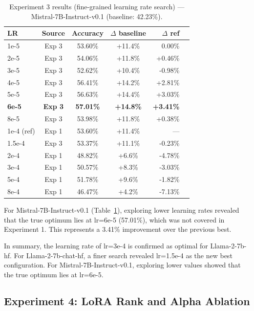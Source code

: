   \begin{table}[ht]
  \caption{Experiment 3 results (fine-grained learning rate search) --- Mistral-7B-Instruct-v0.1 (baseline: 42.23\%).}
  \centering
  \footnotesize
  \begin{tabular}{lcccrr}
  \toprule
  \textbf{LR} & \textbf{Source} & \textbf{Accuracy} & \textbf{$\Delta$ baseline} & \textbf{$\Delta$ ref} \\
  \midrule
  1e-5   & Exp 3 & 53.60\% & +11.4\% & 0.00\% \\
  2e-5   & Exp 3 & 54.06\% & +11.8\% & +0.46\% \\
  3e-5   & Exp 3 & 52.62\% & +10.4\% & -0.98\% \\
  4e-5   & Exp 3 & 56.41\% & +14.2\% & +2.81\% \\
  5e-5   & Exp 3 & 56.63\% & +14.4\% & +3.03\% \\
  \textbf{6e-5} & \textbf{Exp 3} & \textbf{57.01\%} & \textbf{+14.8\%} & \textbf{+3.41\%} \\
  8e-5   & Exp 3 & 53.98\% & +11.8\% & +0.38\% \\
  1e-4 (ref) & Exp 1 & 53.60\% & +11.4\% & --- \\
  1.5e-4 & Exp 3 & 53.37\% & +11.1\% & -0.23\% \\
  2e-4   & Exp 1 & 48.82\% & +6.6\%  & -4.78\% \\
  3e-4   & Exp 1 & 50.57\% & +8.3\%  & -3.03\% \\
  5e-4   & Exp 1 & 51.78\% & +9.6\%  & -1.82\% \\
  8e-4   & Exp 1 & 46.47\% & +4.2\%  & -7.13\% \\
  \bottomrule
  \end{tabular}

  \label{tab:exp3-mistral}
  \end{table}

  For Mistral-7B-Instruct-v0.1
  (Table~\ref{tab:exp3-mistral}), exploring lower
  learning rates revealed that the true optimum lies
  at lr=6e-5 (57.01\%), which was not covered in
  Experiment 1. This represents a 3.41\% improvement
  over the previous best.

In summary, the learning rate of lr=3e-4 is
  confirmed as optimal for Llama-2-7b-hf. For
  Llama-2-7b-chat-hf, a finer search revealed
  lr=1.5e-4 as the new best configuration. For
  Mistral-7B-Instruct-v0.1, exploring lower values
  showed that the true optimum lies at lr=6e-5.

\subsection{Experiment 4: LoRA Rank and Alpha Ablation}

